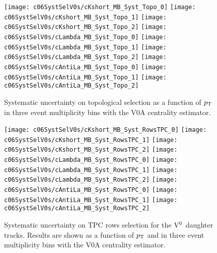 \begin{figure}[htb]
\begin{center}
\texttt{[image: c06SystSelV0s/cKshort\_MB\_Syst\_Topo\_0]}
\texttt{[image: c06SystSelV0s/cKshort\_MB\_Syst\_Topo\_1]}
\texttt{[image: c06SystSelV0s/cKshort\_MB\_Syst\_Topo\_2]}
\texttt{[image: c06SystSelV0s/cLambda\_MB\_Syst\_Topo\_0]}
\texttt{[image: c06SystSelV0s/cLambda\_MB\_Syst\_Topo\_1]}
\texttt{[image: c06SystSelV0s/cLambda\_MB\_Syst\_Topo\_2]}
\texttt{[image: c06SystSelV0s/cAntiLa\_MB\_Syst\_Topo\_0]}
\texttt{[image: c06SystSelV0s/cAntiLa\_MB\_Syst\_Topo\_1]}
\texttt{[image: c06SystSelV0s/cAntiLa\_MB\_Syst\_Topo\_2]}
\caption{Systematic uncertainty on topological selection as a function
         of $p_{\rm T}$ in three event multiplicity bins with the V0A centrality
         estimator.}
\label{fig:c06SystTopo}
\end{center}
\end{figure}

\begin{figure}[htb]
\begin{center}
\texttt{[image: c06SystSelV0s/cKshort\_MB\_Syst\_RowsTPC\_0]}
\texttt{[image: c06SystSelV0s/cKshort\_MB\_Syst\_RowsTPC\_1]}
\texttt{[image: c06SystSelV0s/cKshort\_MB\_Syst\_RowsTPC\_2]}
\texttt{[image: c06SystSelV0s/cLambda\_MB\_Syst\_RowsTPC\_0]}
\texttt{[image: c06SystSelV0s/cLambda\_MB\_Syst\_RowsTPC\_1]}
\texttt{[image: c06SystSelV0s/cLambda\_MB\_Syst\_RowsTPC\_2]}
\texttt{[image: c06SystSelV0s/cAntiLa\_MB\_Syst\_RowsTPC\_0]}
\texttt{[image: c06SystSelV0s/cAntiLa\_MB\_Syst\_RowsTPC\_1]}
\texttt{[image: c06SystSelV0s/cAntiLa\_MB\_Syst\_RowsTPC\_2]}
\caption{Systematic uncertainty on TPC rows selection for
         the ${\rm V}^{0}$ daughter tracks. Results are shown as a function
         of $p_{\rm T}$ and in three event multiplicity bins with the V0A
         centrality estimator.}
\label{fig:c06SystRowsTPC}
\end{center}
\end{figure}

